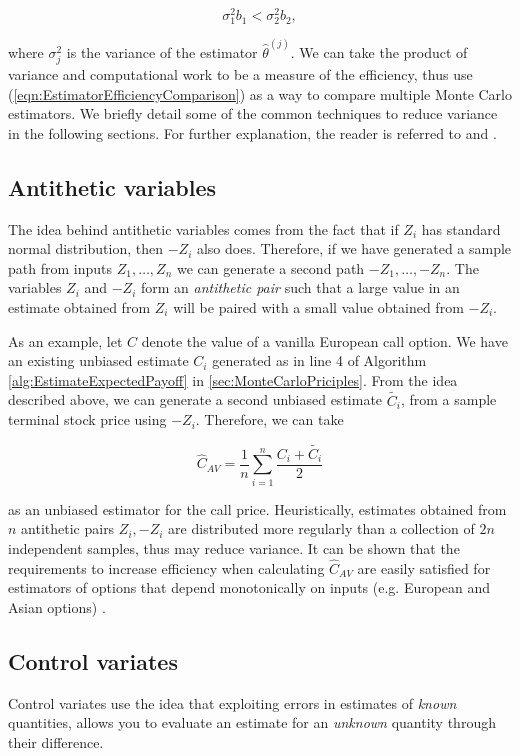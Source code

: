 \begin{equation} \label{eqn:EstimatorEfficiencyComparison}
    \sigma_1^2 b_1 < \sigma_2^2 b_2,
\end{equation}

where $\sigma_j^2$ is the variance of the estimator $\hat{\theta}^{(j)}$. We can take the product of variance and computational work to be a measure of the efficiency, thus use (\ref{eqn:EstimatorEfficiencyComparison}) as a way to compare multiple Monte Carlo estimators. We briefly detail some of the common techniques to reduce variance in the following sections. For further explanation, the reader is referred to \cite{glasserman2004monte} and \cite{boyle1997monte}.

\subsection{Antithetic variables} \label{sec:antitheticvariables}
The idea behind antithetic variables comes from the fact that if $Z_i$ has standard normal distribution, then $-Z_i$ also does. Therefore, if we have generated a sample path from inputs $Z_1, \dots, Z_n$ we can generate a second path $-Z_1, \dots, -Z_n$. The variables $Z_i$ and $-Z_i$ form an \textit{antithetic pair} such that a large value in an estimate obtained from $Z_i$ will be paired with a small value obtained from $-Z_i$.

As an example, let $C$ denote the value of a vanilla European call option. We have an existing unbiased estimate $C_i$ generated as in line 4 of Algorithm \ref{alg:EstimateExpectedPayoff} in \ref{sec:MonteCarloPriciples}. From the idea described above, we can generate a second unbiased estimate $\tilde{C_i}$, from a sample terminal stock price using $-Z_i$. Therefore, we can take

\begin{equation*}
    \hat{C}_{AV} = \frac{1}{n} \sum_{i=1}^n \frac{C_i + \tilde{C_i}}{2}
\end{equation*}

as an unbiased estimator for the call price. Heuristically, estimates obtained from $n$ antithetic pairs ${Z_i, -Z_i}$ are distributed more regularly than a collection of $2n$ independent samples, thus may reduce variance. It can be shown that the requirements to increase efficiency when calculating $\hat{C}_{AV}$ are easily satisfied for estimators of options that depend monotonically on inputs (e.g. European and Asian options) \cite{boyle1997monte}.

\subsection{Control variates}
Control variates use the idea that exploiting errors in estimates of \textit{known} quantities, allows you to evaluate an estimate for an \textit{unknown} quantity through their difference.

